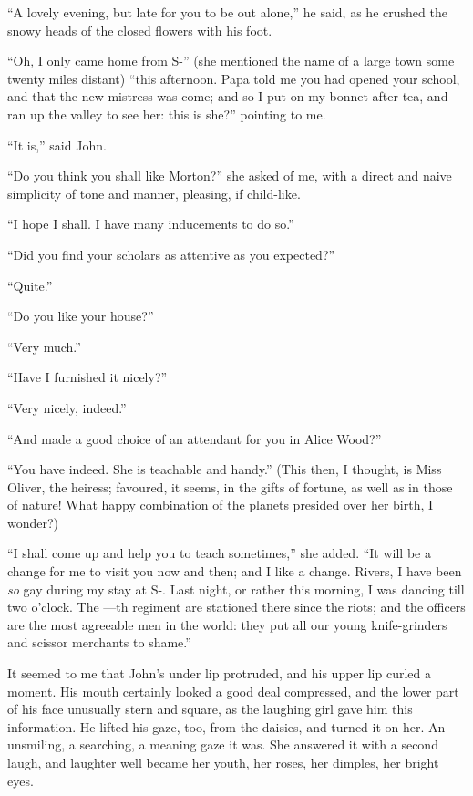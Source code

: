 \enquote{A lovely evening, but late for you to be out alone,} he said,
as he crushed the snowy heads of the closed flowers with his foot.

\enquote{Oh, I only came home from S-} (she mentioned the name of a
large town some twenty miles distant) \enquote{this afternoon. Papa
told me you had opened your school, and that the new mistress was come;
and so I put on my bonnet after tea, and ran up the valley to see her:
this is she?} pointing to me.

\enquote{It is,} said \St{} John.

\enquote{Do you think you shall like Morton?} she asked of me, with a
direct and naive simplicity of tone and manner, pleasing, if child-like.

\enquote{I hope I shall. I have many inducements to do so.}

\enquote{Did you find your scholars as attentive as you expected?}

\enquote{Quite.}

\enquote{Do you like your house?}

\enquote{Very much.}

\enquote{Have I furnished it nicely?}

\enquote{Very nicely, indeed.}

\enquote{And made a good choice of an attendant for you in Alice Wood?}

\enquote{You have indeed. She is teachable and handy.} (This then, I
thought, is Miss Oliver, the heiress; favoured, it seems, in the gifts
of fortune, as well as in those of nature! What happy combination of
the planets presided over her birth, I wonder?)

\enquote{I shall come up and help you to teach sometimes,} she added. 
\enquote{It will be a change for me to visit you now and then; and I like a
change. \Mr{} Rivers, I have been \emph{so} gay during my stay at S-. 
Last night, or rather this morning, I was dancing till two o'clock. The
---th regiment are stationed there since the riots; and the officers are
the most agreeable men in the world: they put all our young
knife-grinders and scissor merchants to shame.}

It seemed to me that \Mr{} \St{} John's under lip protruded, and his upper
lip curled a moment. His mouth certainly looked a good deal compressed,
and the lower part of his face unusually stern and square, as the
laughing girl gave him this information. He lifted his gaze, too, from
the daisies, and turned it on her. An unsmiling, a searching, a meaning
gaze it was. She answered it with a second laugh, and laughter well
became her youth, her roses, her dimples, her bright eyes.

